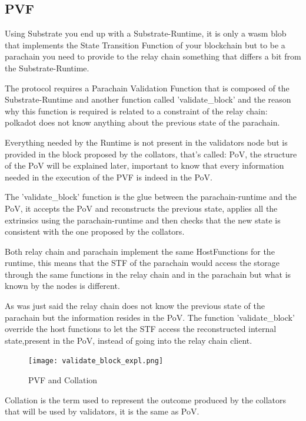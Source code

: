 \subsection{PVF}

Using Substrate you end up with a Substrate-Runtime, it is only a wasm blob that implements the State Transition Function of your blockchain but to be a parachain you need to provide to the relay chain something that differs a bit from the Substrate-Runtime.

The protocol requires a Parachain Validation Function that is composed of the Substrate-Runtime and another function called 'validate\_block' and the reason why this function is required is related to a constraint of the relay chain: polkadot does not know anything about the previous state of the parachain.

Everything needed by the Runtime is not present in the validators node but is provided in the block proposed by the collators, that's called: PoV, the structure of the PoV will be explained later, important to know that every information needed in the execution of the PVF is indeed in the PoV.

The 'validate\_block' function is the glue between the parachain-runtime and the PoV, it accepts the PoV and reconstructs the previous state, applies all the extrinsics using the parachain-runtime and then checks that the new state is consistent with the one proposed by the collators.

Both relay chain and parachain implement the same HostFunctions for the runtime, this means that the STF of the parachain would access the storage through the same functions in the relay chain and in the parachain but what is known by the nodes is different.

As was just said the relay chain does not know the previous state of the parachain but the information resides in the PoV. The function 'validate\_block' override the host functions to let the STF access the reconstructed internal state,present in the PoV, instead of going into the relay chain client.

\begin{figure}[h]
  \centering
  \texttt{[image: validate\_block\_expl.png]}
  \caption{PVF and Collation}
  \label{fig:pvf_pov}
\end{figure}

Collation is the term used to represent the outcome produced by the collators that will be used by validators, it is the same as PoV.

